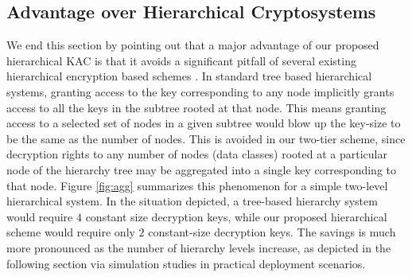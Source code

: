 \subsection{Advantage over Hierarchical Cryptosystems}
\label{subsec:advantage}


We end this section by pointing out that a major advantage of our proposed hierarchical KAC is that it avoids a significant pitfall of several existing hierarchical encryption based schemes \cite{akl1983cryptographic,ateniese2012provably}. In standard tree based hierarchical systems, granting access to the key corresponding to any node implicitly grants access to all the keys in the subtree rooted at that node. This means granting access to a selected set of nodes in a given subtree would blow up the key-size to be the same as the number of nodes. This is avoided in our two-tier scheme, since decryption rights to any number of nodes (data classes) rooted at a particular node of the hierarchy tree may be aggregated into a single key corresponding to that node. Figure \ref{fig:agg} summarizes this phenomenon for a simple two-level hierarchical system. In the situation depicted, a tree-based hierarchy system would require $4$ constant size decryption keys, while our proposed hierarchical scheme would require only $2$ constant-size decryption keys. The savings is much more pronounced as the number of hierarchy levels increase, as depicted in the following section via simulation studies in practical deployment scenarios.



